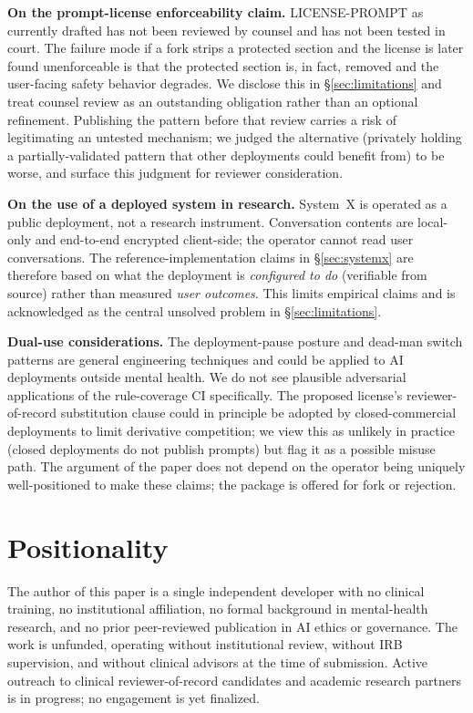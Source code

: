 \documentclass[letterpaper]{article} %
\begin{document}
\noindent\textbf{On the prompt-license enforceability claim.} LICENSE-PROMPT as currently drafted has not been reviewed by counsel and has not been tested in court. The failure mode if a fork strips a protected section and the license is later found unenforceable is that the protected section is, in fact, removed and the user-facing safety behavior degrades. We disclose this in \S\ref{sec:limitations} and treat counsel review as an outstanding obligation rather than an optional refinement. Publishing the pattern before that review carries a risk of legitimating an untested mechanism; we judged the alternative (privately holding a partially-validated pattern that other deployments could benefit from) to be worse, and surface this judgment for reviewer consideration.

\noindent\textbf{On the use of a deployed system in research.} System~X is operated as a public deployment, not a research instrument. Conversation contents are local-only and end-to-end encrypted client-side; the operator cannot read user conversations. The reference-implementation claims in \S\ref{sec:systemx} are therefore based on what the deployment is \emph{configured to do} (verifiable from source) rather than measured \emph{user outcomes}. This limits empirical claims and is acknowledged as the central unsolved problem in \S\ref{sec:limitations}.

\noindent\textbf{Dual-use considerations.} The deployment-pause posture and dead-man switch patterns are general engineering techniques and could be applied to AI deployments outside mental health. We do not see plausible adversarial applications of the rule-coverage CI specifically. The proposed license's reviewer-of-record substitution clause could in principle be adopted by closed-commercial deployments to limit derivative competition; we view this as unlikely in practice (closed deployments do not publish prompts) but flag it as a possible misuse path. The argument of the paper does not depend on the operator being uniquely well-positioned to make these claims; the package is offered for fork or rejection.

\section*{Positionality}

The author of this paper is a single independent developer with no clinical training, no institutional affiliation, no formal background in mental-health research, and no prior peer-reviewed publication in AI ethics or governance. The work is unfunded, operating without institutional review, without IRB supervision, and without clinical advisors at the time of submission. Active outreach to clinical reviewer-of-record candidates and academic research partners is in progress; no engagement is yet finalized.
\end{document}
